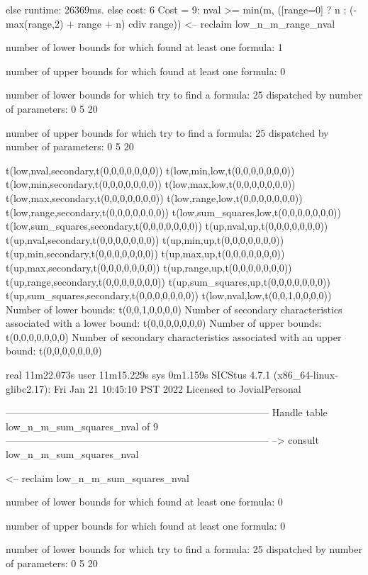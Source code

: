 else runtime: 26369ms. else cost: 6
Cost =  9:  nval >= min(m, ([range=0] ? n : (-max(range,2) + range + n) cdiv range)) %
<-- reclaim low_n_m_range_nval

number of lower bounds for which found at least one formula: 1

number of upper bounds for which found at least one formula: 0

number of lower bounds for which try to find a formula: 25
dispatched by number of parameters: 0  5  20

number of upper bounds for which try to find a formula: 25
dispatched by number of parameters: 0  5  20

t(low,nval,secondary,t(0,0,0,0,0,0,0))
t(low,min,low,t(0,0,0,0,0,0,0))
t(low,min,secondary,t(0,0,0,0,0,0,0))
t(low,max,low,t(0,0,0,0,0,0,0))
t(low,max,secondary,t(0,0,0,0,0,0,0))
t(low,range,low,t(0,0,0,0,0,0,0))
t(low,range,secondary,t(0,0,0,0,0,0,0))
t(low,sum_squares,low,t(0,0,0,0,0,0,0))
t(low,sum_squares,secondary,t(0,0,0,0,0,0,0))
t(up,nval,up,t(0,0,0,0,0,0,0))
t(up,nval,secondary,t(0,0,0,0,0,0,0))
t(up,min,up,t(0,0,0,0,0,0,0))
t(up,min,secondary,t(0,0,0,0,0,0,0))
t(up,max,up,t(0,0,0,0,0,0,0))
t(up,max,secondary,t(0,0,0,0,0,0,0))
t(up,range,up,t(0,0,0,0,0,0,0))
t(up,range,secondary,t(0,0,0,0,0,0,0))
t(up,sum_squares,up,t(0,0,0,0,0,0,0))
t(up,sum_squares,secondary,t(0,0,0,0,0,0,0))
t(low,nval,low,t(0,0,1,0,0,0,0))
Number of lower bounds:                                             t(0,0,1,0,0,0,0)
Number of secondary characteristics associated with a lower bound:  t(0,0,0,0,0,0,0)
Number of upper bounds:                                             t(0,0,0,0,0,0,0)
Number of secondary characteristics associated with an upper bound: t(0,0,0,0,0,0,0)

real	11m22.073s
user	11m15.229s
sys	0m1.159s
SICStus 4.7.1 (x86_64-linux-glibc2.17): Fri Jan 21 10:45:10 PST 2022
Licensed to JovialPersonal


--------------------------------------------------------------------------------
Handle table low_n_m_sum_squares_nval of 9
--------------------------------------------------------------------------------
--> consult low_n_m_sum_squares_nval

<-- reclaim low_n_m_sum_squares_nval

number of lower bounds for which found at least one formula: 0

number of upper bounds for which found at least one formula: 0

number of lower bounds for which try to find a formula: 25
dispatched by number of parameters: 0  5  20

